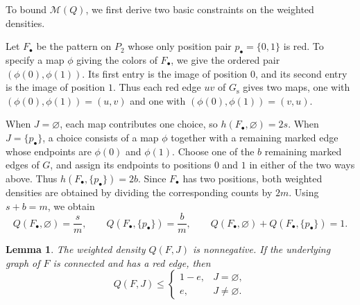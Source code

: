 \documentclass[preprint,11pt,numbers]{elsarticle-arxiv}
\numberwithin{equation}{section}
\newtheorem{lemma}[theorem]{Lemma}
\theoremstyle{definition}
\begin{document}
To bound $\mathcal M(Q)$, we first derive two basic constraints
on the weighted densities.

Let $F_\bullet$ be the pattern on $P_2$ whose only position pair
$p_\bullet=\{0,1\}$ is red. To specify a map $\phi$ giving the colors
of $F_\bullet$, we give the ordered pair $(\phi(0),\phi(1))$. Its
first entry is the image of position $0$, and its second entry is the
image of position $1$. Thus each red edge $uv$ of $G_{\mathrm s}$
gives two maps, one with $(\phi(0),\phi(1))=(u,v)$ and one with
$(\phi(0),\phi(1))=(v,u)$.

When $J=\varnothing$, each map contributes one choice, so
$h(F_\bullet,\varnothing)=2s$. When $J=\{p_\bullet\}$, a choice
consists of a map $\phi$ together with a remaining marked edge whose
endpoints are $\phi(0)$ and $\phi(1)$. Choose one of the $b$ remaining
marked edges of $G$, and assign its endpoints to positions $0$ and $1$
in either of the two ways above. Thus $h(F_\bullet,\{p_\bullet\})=2b$.
Since $F_\bullet$ has two positions, both weighted densities are
obtained by dividing the corresponding counts by $2m$. Using
$s+b=m$, we obtain
\begin{equation}\label{eq:weighted-normalization}
 Q(F_\bullet,\varnothing)=\frac{s}{m},\qquad
 Q(F_\bullet,\{p_\bullet\})=\frac{b}{m},\qquad
 Q(F_\bullet,\varnothing)+Q(F_\bullet,\{p_\bullet\})=1.
\end{equation}

\begin{lemma}\label{lem:weighted-density-bounds}
The weighted density $Q(F,J)$ is nonnegative. If the underlying
graph of $F$ is connected and has a red edge, then
\begin{equation}\label{eq:weighted-density-bounds}
 Q(F,J)\leq
 \begin{cases}
  1-e,& J=\varnothing,\\
  e,& J\ne\varnothing .
 \end{cases}
\end{equation}
\end{lemma}
\end{document}
